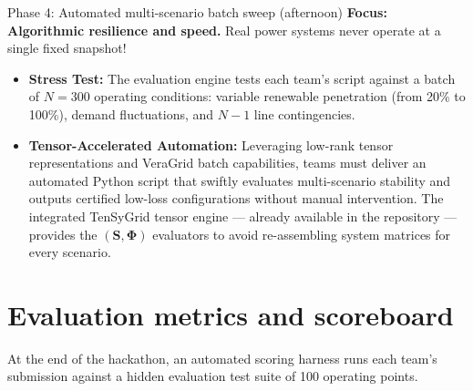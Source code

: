 \documentclass[11pt,a4paper]{article}
\begin{document}
\begin{challengebox}{Phase 4: Automated multi-scenario batch sweep (afternoon)}
  \textbf{Focus: Algorithmic resilience and speed.} Real power systems never operate at a single fixed snapshot!
  \begin{itemize}[leftmargin=*, itemsep=1pt]
    \item \textbf{Stress Test:} The evaluation engine tests each team's script against a batch of $N = 300$ operating conditions: variable renewable penetration (from 20\% to 100\%), demand fluctuations, and $N-1$ line contingencies.
    \item \textbf{Tensor-Accelerated Automation:} Leveraging low-rank tensor representations and VeraGrid batch capabilities, teams must deliver an automated Python script that swiftly evaluates multi-scenario stability and outputs certified low-loss configurations without manual intervention. The integrated TenSyGrid tensor engine --- already available in the repository --- provides the $( \mathbf{S}, \boldsymbol{\Phi})$ evaluators to avoid re-assembling system matrices for every scenario.
  \end{itemize}
\end{challengebox}

\section{Evaluation metrics and scoreboard}

At the end of the hackathon, an automated scoring harness runs each team's submission against a hidden evaluation test suite of 100 operating points.
\end{document}
